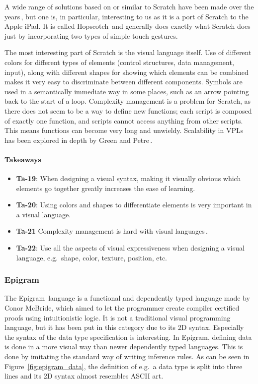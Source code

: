 A wide range of solutions based on or similar to Scratch have been made over the years\,\cite{hosick2014}, but one is, in particular, interesting to us as it is a port of Scratch to the Apple iPad. It is called Hopscotch\,\cite{hopscotch} and generally does exactly what Scratch does just by incorporating two types of simple touch gestures.

The most interesting part of Scratch is the visual language itself.
Use of different colors for different types of elements (control structures, data management, input), along with different shapes for showing which elements can be combined makes it very easy to discriminate between different components.
Symbols are used in a semantically immediate way in some places, such as an arrow pointing back to the start of a loop. 
Complexity management is a problem for Scratch, as there does not seem to be a way to define new functions; each script is composed of exactly one function, and scripts cannot access anything from other scripts.
This means functions can become very long and unwieldy.
Scalability in VPLs has been explored in depth by Green and Petre\,\cite{green1992visual}.

\paragraph{Takeaways}
\begin{itemize}
	\item \textbf{Ta-19}: When designing a visual syntax, making it visually obvious which elements go together greatly increases the ease of learning.
	\item \textbf{Ta-20}: Using colors and shapes to differentiate elements is very important in a visual language.
	\item \textbf{Ta-21} Complexity management is hard with visual languages\,\cite{green1992visual}.
	\item \textbf{Ta-22}: Use all the aspects of visual expressiveness when designing a visual language, e.g.\ shape, color, texture, position, etc.
\end{itemize}

\subsubsection{Epigram}
\label{subsub:Epigram}
The Epigram\,\cite{mcbride2005epigram} language is a functional and dependently typed language made by Conor McBride, which aimed to let the programmer create compiler certified proofs using intuitionistic logic.
It is not a traditional visual programming language, but it has been put in this category due to its 2D syntax.
Especially the syntax of the data type specification is interesting.
In Epigram, defining data is done in a more visual way than newer dependently typed languages. 
This is done by imitating the standard way of writing inference rules.
As can be seen in Figure~\ref{fig:epigram_data}, the definition of e.g.\ a data type is split into three lines and its 2D syntax almost resembles ASCII art. 


